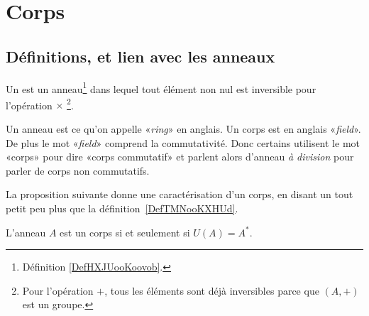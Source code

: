 
\section{Corps}

\subsection{Définitions, et lien avec les anneaux}

\begin{definition}  \label{DefTMNooKXHUd}
    Un  est un anneau\footnote{Définition \ref{DefHXJUooKoovob}.} dans lequel tout élément non nul est inversible pour l'opération \( \times\) \footnote{Pour l'opération \( +\), tous les éléments sont déjà inversibles parce que \( (A,+)\) est un groupe.}.
\end{definition}

\begin{remark}      \label{REMooYRNUooYgBBKF}
    Un anneau est ce qu'on appelle «\emph{ring}» en anglais. Un corps est en anglais «\emph{field}». De plus le mot «\emph{field}» comprend la commutativité. Donc certains utilisent le mot «corps» pour dire «corps commutatif» et parlent alors d'anneau \emph{à division} pour parler de corps non commutatifs.
\end{remark}

La proposition suivante donne une caractérisation d'un corps, en disant un tout petit peu plus que la définition~\ref{DefTMNooKXHUd}.
\begin{proposition}
    L'anneau $A$ est un corps si et seulement si \( U(A) = A^* \).
\end{proposition}

